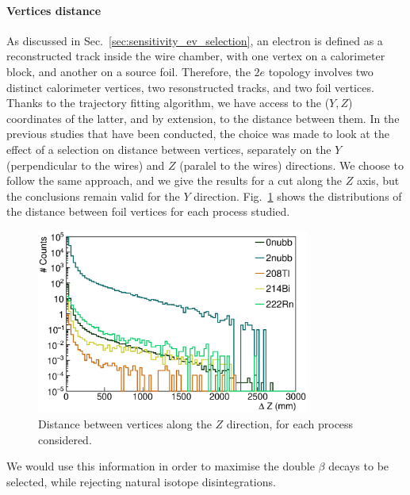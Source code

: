 \paragraph{Vertices distance}
As discussed in Sec.~\ref{sec:sensitivity_ev_selection}, an electron is defined as a reconstructed track inside the wire chamber, with one vertex on a calorimeter block, and another on a source foil.
Therefore, the $2e$ topology involves two distinct calorimeter vertices, two resonstructed tracks, and two foil vertices.
Thanks to the trajectory fitting algorithm, we have access to the ($Y,Z$) coordinates of the latter, and by extension, to the distance between them.
In the previous studies that have been conducted, the choice was made to look at the effect of a selection on distance between vertices, separately on the $Y$ (perpendicular to the wires) and $Z$ (paralel to the wires) directions.
We choose to follow the same approach, and we give the results for a cut along the $Z$ axis, but the conclusions remain valid for the $Y$ direction.
Fig.~\ref{fig:vertex_dist} shows the distributions of the distance between foil vertices for each process studied.
\begin{figure}[h]
  \centering
  \includegraphics[width=0.8\textwidth]{Sensitivity/fig_sensitivity/Vertex_distance.eps}
  \caption{Distance between vertices along the $Z$ direction, for each process considered.
    \label{fig:vertex_dist}}
\end{figure}
We would use this information in order to maximise the double $\beta$ decays to be selected, while rejecting natural isotope disintegrations.

